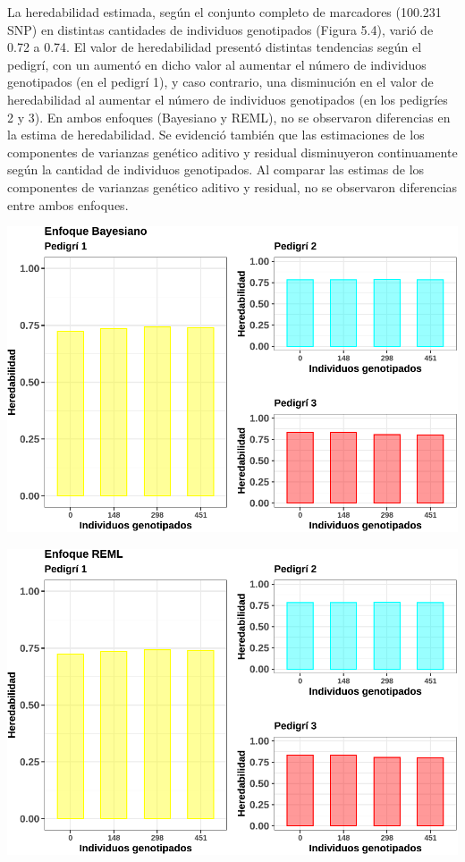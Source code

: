 \documentclass[11pt,spanish,a4paper,oneside,]{book} %
\begin{document}
\hspace*{1em}

La heredabilidad estimada, según el conjunto completo de marcadores (100.231 SNP) en distintas cantidades de individuos genotipados (Figura 5.4), varió de 0.72 a 0.74. El valor de heredabilidad presentó distintas tendencias según el pedigrí, con un aumentó en dicho valor al aumentar el número de individuos genotipados (en el pedigrí 1), y caso contrario, una disminución en el valor de heredabilidad al aumentar el número de individuos genotipados (en los pedigríes 2 y 3). En ambos enfoques (Bayesiano y REML), no se observaron diferencias en la estima de heredabilidad. Se evidenció también que las estimaciones de los componentes de varianzas genético aditivo y residual disminuyeron continuamente según la cantidad de individuos genotipados. Al comparar las estimas de los componentes de varianzas genético aditivo y residual, no se observaron diferencias entre ambos enfoques.

\begin{center}\includegraphics[width=1\linewidth]{figures/param_Bayes_2} \end{center}

\begin{center}\includegraphics[width=1\linewidth]{figures/param_reml_2} \end{center}
\end{document}
